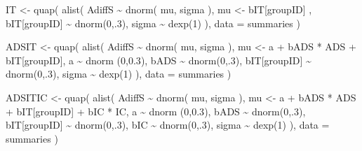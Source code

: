 \documentclass[
  10pt,
  dvipsnames,enabledeprecatedfontcommands]{scrartcl}
\newenvironment{Shaded}{\begin{snugshade}}{\end{snugshade}}
\newcommand{\AttributeTok}[1]{\textcolor[rgb]{0.77,0.63,0.00}{#1}}
\newcommand{\DecValTok}[1]{\textcolor[rgb]{0.00,0.00,0.81}{#1}}
\newcommand{\FloatTok}[1]{\textcolor[rgb]{0.00,0.00,0.81}{#1}}
\newcommand{\FunctionTok}[1]{\textcolor[rgb]{0.00,0.00,0.00}{#1}}
\newcommand{\NormalTok}[1]{#1}
\newcommand{\OtherTok}[1]{\textcolor[rgb]{0.56,0.35,0.01}{#1}}
\newcommand{\SpecialCharTok}[1]{\textcolor[rgb]{0.00,0.00,0.00}{#1}}
\begin{document}
\begin{Shaded}
\begin{Highlighting}[]
\NormalTok{IT }\OtherTok{\textless{}{-}} \FunctionTok{quap}\NormalTok{(}
  \FunctionTok{alist}\NormalTok{(}
\NormalTok{    AdiffS }\SpecialCharTok{\textasciitilde{}} \FunctionTok{dnorm}\NormalTok{( mu, sigma ),}
\NormalTok{    mu }\OtherTok{\textless{}{-}}\NormalTok{  bIT[groupID] ,}
\NormalTok{    bIT[groupID] }\SpecialCharTok{\textasciitilde{}} \FunctionTok{dnorm}\NormalTok{(}\DecValTok{0}\NormalTok{,.}\DecValTok{3}\NormalTok{),}
\NormalTok{    sigma  }\SpecialCharTok{\textasciitilde{}} \FunctionTok{dexp}\NormalTok{(}\DecValTok{1}\NormalTok{)}
\NormalTok{  ), }
  \AttributeTok{data =}\NormalTok{ summaries}
\NormalTok{)}


\NormalTok{ADSIT }\OtherTok{\textless{}{-}} \FunctionTok{quap}\NormalTok{(}
  \FunctionTok{alist}\NormalTok{(}
\NormalTok{    AdiffS }\SpecialCharTok{\textasciitilde{}} \FunctionTok{dnorm}\NormalTok{( mu, sigma ),}
\NormalTok{    mu }\OtherTok{\textless{}{-}}\NormalTok{ a }\SpecialCharTok{+}\NormalTok{ bADS }\SpecialCharTok{*}\NormalTok{ ADS }\SpecialCharTok{+}\NormalTok{  bIT[groupID],}
\NormalTok{    a }\SpecialCharTok{\textasciitilde{}} \FunctionTok{dnorm}\NormalTok{ (}\DecValTok{0}\NormalTok{,}\FloatTok{0.3}\NormalTok{),}
\NormalTok{    bADS }\SpecialCharTok{\textasciitilde{}} \FunctionTok{dnorm}\NormalTok{(}\DecValTok{0}\NormalTok{,.}\DecValTok{3}\NormalTok{),}
\NormalTok{    bIT[groupID] }\SpecialCharTok{\textasciitilde{}} \FunctionTok{dnorm}\NormalTok{(}\DecValTok{0}\NormalTok{,.}\DecValTok{3}\NormalTok{),}
\NormalTok{    sigma  }\SpecialCharTok{\textasciitilde{}} \FunctionTok{dexp}\NormalTok{(}\DecValTok{1}\NormalTok{)}
\NormalTok{  ), }
  \AttributeTok{data =}\NormalTok{ summaries}
\NormalTok{)}


\NormalTok{ADSITIC }\OtherTok{\textless{}{-}} \FunctionTok{quap}\NormalTok{(}
  \FunctionTok{alist}\NormalTok{(}
\NormalTok{    AdiffS }\SpecialCharTok{\textasciitilde{}} \FunctionTok{dnorm}\NormalTok{( mu, sigma ),}
\NormalTok{    mu }\OtherTok{\textless{}{-}}\NormalTok{ a }\SpecialCharTok{+}\NormalTok{ bADS }\SpecialCharTok{*}\NormalTok{ ADS }\SpecialCharTok{+}\NormalTok{  bIT[groupID] }\SpecialCharTok{+}\NormalTok{ bIC }\SpecialCharTok{*}\NormalTok{ IC,}
\NormalTok{    a }\SpecialCharTok{\textasciitilde{}} \FunctionTok{dnorm}\NormalTok{ (}\DecValTok{0}\NormalTok{,}\FloatTok{0.3}\NormalTok{),}
\NormalTok{    bADS }\SpecialCharTok{\textasciitilde{}} \FunctionTok{dnorm}\NormalTok{(}\DecValTok{0}\NormalTok{,.}\DecValTok{3}\NormalTok{),}
\NormalTok{    bIT[groupID] }\SpecialCharTok{\textasciitilde{}} \FunctionTok{dnorm}\NormalTok{(}\DecValTok{0}\NormalTok{,.}\DecValTok{3}\NormalTok{),}
\NormalTok{    bIC }\SpecialCharTok{\textasciitilde{}} \FunctionTok{dnorm}\NormalTok{(}\DecValTok{0}\NormalTok{,.}\DecValTok{3}\NormalTok{),}
\NormalTok{    sigma  }\SpecialCharTok{\textasciitilde{}} \FunctionTok{dexp}\NormalTok{(}\DecValTok{1}\NormalTok{)}
\NormalTok{  ), }
  \AttributeTok{data =}\NormalTok{ summaries}
\NormalTok{)}



\end{Highlighting}
\end{Shaded}
\end{document}
